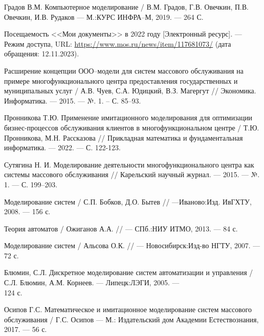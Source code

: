 
\renewcommand\bibname{СПИСОК ИСПОЛЬЗОВАННЫХ ИСТОЧНИКОВ}
\begin{thebibliography}{}
	
\setlength\bibindent{1.25cm}
\makeatletter
\let\old@biblabel\@biblabel
\def\@biblabel#1{\kern\bibindent\old@biblabel{#1}}
\makeatother

 Градов В.М. Компьютерное моделирование / В.М. Градов, Г.В. Овечкин, П.В. Овечкин, И.В. Рудаков --- М.:КУРС ИНФРА--М, 2019. --- 264 С. 

 Посещаемость <<Мои документы>> в 2022 году [Электронный ресурс]. --- Режим доступа, URL: \url{https://www.mos.ru/news/item/117681073/} (дата обращения: 12.11.2023).

  Расширение концепции ООО--модели для систем массового обслуживания на примере многофункционального центра предоставления государственных и муниципальных услуг / А.В. Чуев, С.А. Юдицкий, В.З. Магергут // Экономика. Информатика. --- 2015. --- №. 1. – С. 85--93.

 Пронникова Т.Ю. Применение имитационного моделирования для оптимизации бизнес-процессов обслуживания клиентов в многофункциональном центре / Т.Ю. Пронникова, М.Н. Рассказова // Прикладная математика и фундаментальная информатика. --- 2022. --- С. 122-123.

 Сутягина Н. И. Моделирование деятельности многофункционального центра как системы массового обслуживания // Карельский научный журнал. --- 2015. --- №. 1. --- С. 199--203.

 Моделирование систем / С.П. Бобков, Д.О. Бытев // ---Иваново:Изд. ИвГХТУ, 2008. --- 156 с. 

 Теория автоматов / Ожиганов А.А. // --- СПб.:НИУ ИТМО, 2013. --- 84 с. 

 Моделирование систем / Альсова О.К. // --- Новосибирск:Изд-во НГТУ, 2007. --- 72 с.

 Блюмин, С.Л. Дискретное моделирование систем автоматизации и управления / С.Л. Блюмин, А.М. Корнеев. --- Липецк:ЛЭГИ, 2005. ---\\124 с.

 Осипов Г.С. Математическое и имитационное моделирование систем массового
обслуживания / Г.С. Осипов --- М.: Издательский дом Академии Естествознания, 2017. --- 56 с.


\end{thebibliography}
